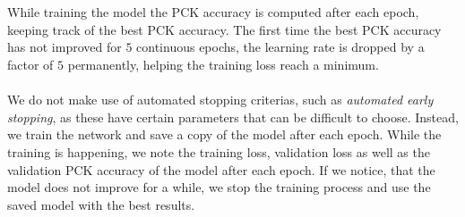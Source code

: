 \documentclass[./main.tex]{subfiles}
\begin{document}
\\
\\
While training the model the PCK accuracy is computed after each epoch, keeping track of the best PCK accuracy. The first time the best PCK accuracy has not improved for $5$ continuous epochs, the learning rate is dropped by a factor of $5$ permanently, helping the training loss reach a minimum.
\\
\\
We do not make use of automated stopping criterias, such as \textit{automated early stopping}, as these have certain parameters that can be difficult to choose. Instead, we train the network and save a copy of the model after each epoch. While the training is happening, we note the training loss, validation loss as well as the validation PCK accuracy of the model after each epoch. If we notice, that the model does not improve for a while, we stop the training process and use the saved model with the best results.
\end{document}
